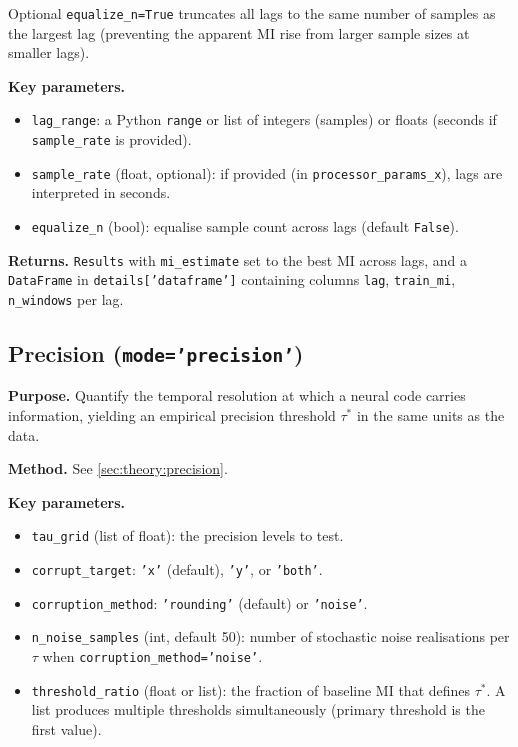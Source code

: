 \documentclass[12pt]{article}
\newcommand{\api}[1]{\texttt{#1}}
\begin{document}
Optional \api{equalize\_n=True} truncates all lags to the same number of
samples as the largest lag (preventing the apparent MI rise from larger
sample sizes at smaller lags).

\textbf{Key parameters.}
\begin{itemize}[leftmargin=*]
  \item \api{lag\_range}: a Python \api{range} or list of integers
        (samples) or floats (seconds if \api{sample\_rate} is provided).
  \item \api{sample\_rate} (float, optional): if provided (in
        \api{processor\_params\_x}), lags are interpreted in seconds.
  \item \api{equalize\_n} (bool): equalise sample count across lags
        (default \api{False}).
\end{itemize}

\textbf{Returns.}  \api{Results} with \api{mi\_estimate} set to the best
MI across lags, and a \api{DataFrame} in \api{details['dataframe']}
containing columns \api{lag}, \api{train\_mi}, \api{n\_windows} per lag.

\subsection{Precision (\texttt{mode='precision'})}
\label{sec:modes:precision}

\textbf{Purpose.}  Quantify the temporal resolution at which a neural
code carries information, yielding an empirical precision threshold
$\tau^*$ in the same units as the data.

\textbf{Method.}  See \cref{sec:theory:precision}.

\textbf{Key parameters.}
\begin{itemize}[leftmargin=*]
  \item \api{tau\_grid} (list of float): the precision levels to test.
  \item \api{corrupt\_target}: \api{'x'} (default), \api{'y'}, or
        \api{'both'}.
  \item \api{corruption\_method}: \api{'rounding'} (default) or
        \api{'noise'}.
  \item \api{n\_noise\_samples} (int, default 50): number of stochastic
        noise realisations per $\tau$ when \api{corruption\_method='noise'}.
  \item \api{threshold\_ratio} (float or list): the fraction of baseline MI
        that defines $\tau^*$.  A list produces multiple thresholds
        simultaneously (primary threshold is the first value).
\end{itemize}
\end{document}
